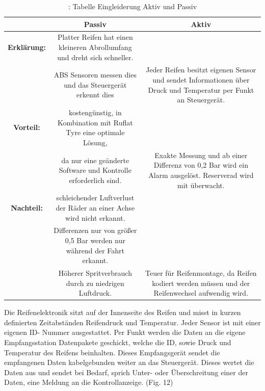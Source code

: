 				\begin{table}	
					\begin{tabular}{c|c|c}
						
						\textbf {  } & \textbf{Passiv} & \textbf {Aktiv}\\
						
						
						\hline
						\textbf{Erklärung:} & Platter Reifen hat einen kleineren Abrollumfang und dreht sich schneller.\\&ABS Sensoren messen dies und das Steuergerät erkennt dies & Jeder Reifen besitzt eigenen Sensor und sendet Informationen über Druck und Temperatur per Funkt an Steuergerät.\\
						
						
						\hline
						\textbf{Vorteil:} & kostengünstig, in Kombination mit Ruflat Tyre eine optimale Lösung, \\&da nur eine geänderte Software und Kontrolle erforderlich sind. & Exakte Messung und ab einer Differenz von 0,2 Bar wird ein Alarm ausgelöst. Reserverad wird mit überwacht.\\
						
	
						\hline
						\textbf{Nachteil:} & schleichender Luftverlust der Räder an einer Achse wird nicht erkannt.\\&Differenzen nur von größer 0,5 Bar werden nur während der Fahrt erkannt.\\&  Höherer Spritverbrauch durch zu niedrigen Luftdruck. & Teuer für Reifenmontage, da Reifen kodiert werden müssen und der Reifenwechsel aufwendig wird.\\
						\hline
					
					\end{tabular}
				\caption{ \cite{TS22}: Tabelle Eingleiderung Aktiv und Passiv}
				\end{table}	
			
			
				\begin{flushleft}
						
					Die Reifenelektronik sitzt auf der Innenseite des Reifen und misst in kurzen definierten Zeitabständen Reifendruck und Temperatur. Jeder Sensor ist mit einer eigenen ID- Nummer ausgestattet. Per Funkt werden die Daten an die eigene Empfangsstation Datenpakete geschickt, welche die ID, sowie Druck und Temperatur des Reifens beinhalten. Dieses Empfangsgerät sendet die empfangenen Daten kabelgebunden weiter an das Steuergerät. Dieses wertet die Daten aus und sendet bei Bedarf, sprich Unter- oder Überschreitung einer der Daten, eine Meldung an die Kontrollanzeige. (Fig. 12)
					
				\end{flushleft}	
				
